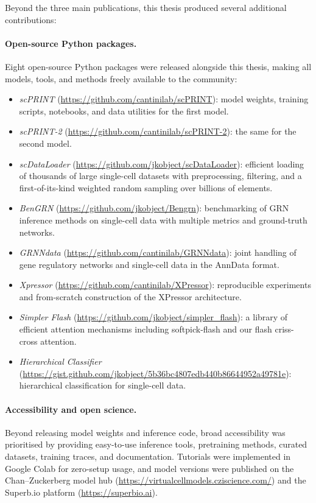 Beyond the three main publications, this thesis produced several additional contributions:

\paragraph{Open-source Python packages.} Eight open-source Python packages were released alongside
this thesis, making all models, tools, and methods freely available to the community:
\begin{itemize}
  \item \emph{\gls{scPRINT}} (\url{https://github.com/cantinilab/scPRINT}): model weights,
    training scripts, notebooks, and data utilities for the first model.
  \item \emph{scPRINT-2} (\url{https://github.com/cantinilab/scPRINT-2}): the same for the
    second model.
  \item \emph{scDataLoader} (\url{https://github.com/jkobject/scDataLoader}): efficient loading
    of thousands of large single-cell datasets with preprocessing, filtering, and a
    first-of-its-kind weighted random sampling over billions of elements.
  \item \emph{BenGRN} (\url{https://github.com/jkobject/Bengrn}): benchmarking of \gls{GRN}
    inference methods on single-cell data with multiple metrics and ground-truth networks.
  \item \emph{GRNNdata} (\url{https://github.com/cantinilab/GRNNdata}): joint handling of gene
    regulatory networks and single-cell data in the AnnData format.
  \item \emph{Xpressor} (\url{https://github.com/cantinilab/XPressor}): reproducible experiments
    and from-scratch construction of the XPressor architecture.
  \item \emph{Simpler Flash} (\url{https://github.com/jkobject/simpler_flash}): a library of
    efficient attention mechanisms including softpick-flash and our flash criss-cross attention.
  \item \emph{Hierarchical Classifier}
    (\url{https://gist.github.com/jkobject/5b36bc4807edb440b86644952a49781e}): hierarchical
    classification for single-cell data.
\end{itemize}

\paragraph{Accessibility and open science.} Beyond releasing model weights and inference code,
broad accessibility was prioritised by providing easy-to-use inference tools, pretraining methods,
curated datasets, training traces, and documentation. Tutorials were implemented in Google Colab
for zero-setup usage, and model versions were published on the Chan--Zuckerberg model hub
(\url{https://virtualcellmodels.cziscience.com/}) and the Superb.io platform
(\url{https://superbio.ai}).

